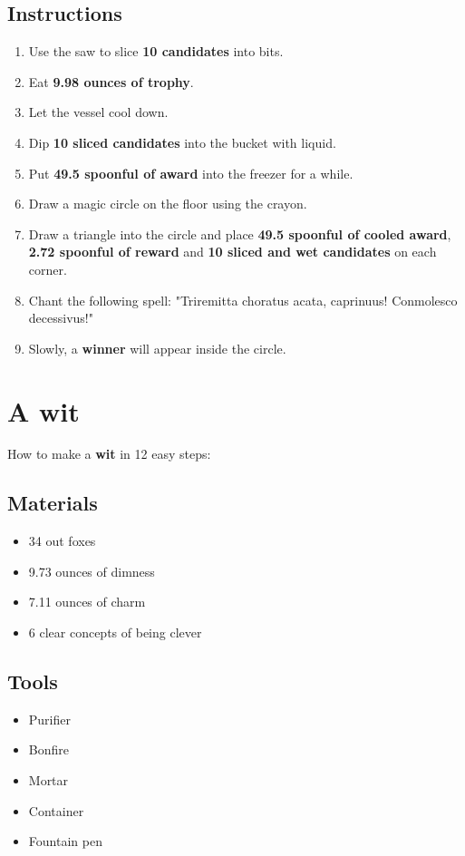 \documentclass{article}
\begin{document}
\subsection{Instructions}\begin{enumerate}
\item 
Use the saw to slice \textbf{10 candidates} into bits.
\item 
Eat \textbf{9.98 ounces of trophy}.
\item 
Let the vessel cool down.
\item 
Dip \textbf{10 sliced candidates} into the bucket with liquid.
\item 
Put \textbf{49.5 spoonful of award} into the freezer for a while.
\item 
Draw a magic circle on the floor using the crayon.
\item 
Draw a triangle into the circle and place \textbf{49.5 spoonful of cooled award}, \textbf{2.72 spoonful of reward} and \textbf{10 sliced and wet candidates} on each corner.
\item 
Chant the following spell: "Triremitta choratus acata, caprinuus! Conmolesco decessivus!"
\item 
Slowly, a \textbf{winner} will appear inside the circle.
\end{enumerate}
\newpage
\section{A wit}How to make a \textbf{wit} in 12 easy steps:

\subsection{Materials}\begin{itemize}
\item 
34 out foxes
\item 
9.73 ounces of dimness
\item 
7.11 ounces of charm
\item 
6 clear concepts of being clever
\end{itemize}
\subsection{Tools}\begin{itemize}
\item 
Purifier
\item 
Bonfire
\item 
Mortar
\item 
Container
\item 
Fountain pen
\end{itemize}
\end{document}
